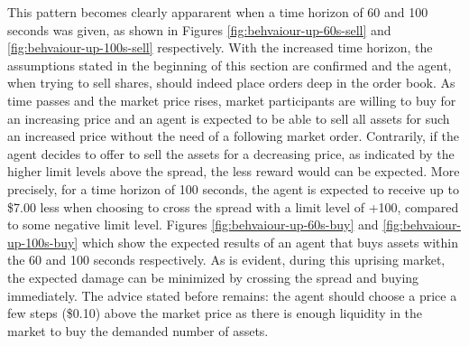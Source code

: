 This pattern becomes clearly appararent when a time horizon of 60 and 100 seconds was given, as shown in Figures \ref{fig:behvaiour-up-60s-sell} and \ref{fig:behvaiour-up-100s-sell} respectively.
With the increased time horizon, the assumptions stated in the beginning of this section are confirmed and the agent, when trying to sell shares, should indeed place orders deep in the order book.
As time passes and the market price rises, market participants are willing to buy for an increasing price and an agent is expected to be able to sell all assets for such an increased price without the need of a following market order.
Contrarily, if the agent decides to offer to sell the assets for a decreasing price, as indicated by the higher limit levels above the spread, the less reward would can be expected.
More precisely, for a time horizon of 100 seconds, the agent is expected to receive up to \$7.00 less when choosing to cross the spread with a limit level of +100, compared to some negative limit level.
Figures \ref{fig:behvaiour-up-60s-buy} and \ref{fig:behvaiour-up-100s-buy} which show the expected results of an agent that buys assets within the 60 and 100 seconds respectively.
As is evident, during this uprising market, the expected damage can be minimized by crossing the spread and buying immediately.
The advice stated before remains: the agent should choose a price a few steps (\$0.10) above the market price as there is enough liquidity in the market to buy the demanded number of assets.

